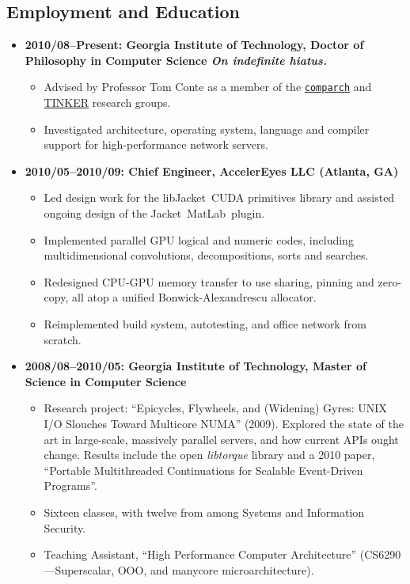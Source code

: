\documentclass{article}
\newenvironment{tightitemize}
{\begin{itemize}
  \setlength{\itemsep}{1pt}
  \setlength{\parskip}{0pt}
  \setlength{\parsep}{0pt}}
{\end{itemize}}
\begin{document}
\subsection*{Employment and Education}
\begin{tightitemize}
\item \textbf{2010/08--Present: Georgia Institute of Technology,
Doctor of Philosophy in Computer Science
\hfill \tiny\textit{On indefinite hiatus.}}
\footnotesize
\begin{tightitemize}
\item Advised by Professor Tom Conte as a member of the \href{http://comparch.gatech.edu/}{\texttt{comparch}} and \href{http://tinker.cc.gatech.edu/}{TINKER} research groups.
\item Investigated architecture, operating system, language and compiler support for high-performance network servers.\\
\end{tightitemize}

\item \textbf{2010/05--2010/09: Chief Engineer, AccelerEyes LLC (Atlanta, GA)}
\begin{tightitemize}
\item Led design work for the libJacket\texttrademark\ CUDA primitives library and assisted ongoing design of the Jacket\texttrademark\ MatLab\textregistered\ plugin.
\item Implemented parallel GPU logical and numeric codes, including multidimensional convolutions, decompositions, sorts and searches.
\item Redesigned CPU-GPU memory transfer to use sharing, pinning and zero-copy, all atop a unified Bonwick-Alexandrescu allocator.
\item Reimplemented build system, autotesting, and office network from scratch.\\
\end{tightitemize}

\item \textbf{2008/08--2010/05: Georgia Institute of Technology, Master of Science in Computer Science}
\begin{tightitemize}
\item Research project: ``Epicycles, Flywheels, and (Widening) Gyres: UNIX I/O
  Slouches Toward Multicore NUMA'' (2009). Explored the state of the art in
  large-scale, massively parallel servers, and how current APIs ought
  change. Results include the open \textit{libtorque} library and a 2010 paper,
  ``Portable Multithreaded Continuations for Scalable Event-Driven Programs''.
\item Sixteen classes, with twelve from among Systems and Information Security.
\item Teaching Assistant, ``High Performance Computer Architecture'' (CS6290---Superscalar, OOO, and manycore microarchitecture).\\
\end{tightitemize}


\end{tightitemize}
\end{document}
